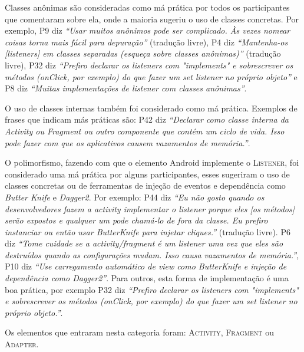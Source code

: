 Classes an\^onimas s\~ao consideradas como m\'a pr\'atica por todos os participantes que comentaram sobre ela, onde a maioria sugeriu o uso de classes concretas. Por exemplo, P9 diz \textit{``Usar muitos an\^onimos pode ser complicado. Às vezes nomear coisas torna mais f\'acil para depura\c{c}\~ao''} (tradu\c{c}\~ao livre), P4 diz \textit{``Mantenha-os [listeners] em classes separadas (esque\c{c}a sobre classes an\^onimas)''} (tradu\c{c}\~ao livre), P32 diz \textit{``Prefiro declarar os listeners com "implements" e sobrescrever os m\'etodos (onClick, por exemplo) do que fazer um set listener no pr\'oprio objeto''} e P8 diz \textit{``Muitas implementa\c{c}\~oes de listener com classes an\^onimas''}.

O uso de classes internas tamb\'em foi considerado como m\'a pr\'atica. Exemplos de frases que indicam m\'as pr\'aticas s\~ao: P42 diz \textit{``Declarar como classe interna da Activity ou Fragment ou outro componente que cont\'em um ciclo de vida. Isso pode fazer com que os aplicativos causem vazamentos de mem\'oria.''}.

O polimorfismo, fazendo com que o elemento Android implemente o \textsc{Listener}, foi considerado uma m\'a pr\'atica por alguns participantes, esses sugeriram o uso de classes concretas ou de ferramentas de inje\c{c}\~ao de eventos e depend\^encia como \textit{Butter Knife} \cite{ButterKnife} e \textit{Dagger2}. Por exemplo: P44 diz \textit{``Eu n\~ao gosto quando os desenvolvedores fazem a activity implementar o listener porque eles [os m\'etodos] ser\~ao expostos e qualquer um pode cham\'a-lo de fora da classe. Eu prefiro instanciar ou ent\~ao usar ButterKnife para injetar cliques.''} (tradu\c{c}\~ao livre). P6 diz \textit{``Tome cuidade se a activity/fragment \'e um listener uma vez que eles s\~ao destru\'idos quando as configura\c{c}\~oes mudam. Isso causa vazamentos de mem\'oria.''}, P10 diz \textit{``Use carregamento autom\'atico de view como ButterKnife e inje\c{c}\~ao de depend\^encia como Dagger2''}. Para outros, esta forma de implementa\c{c}\~ao \'e uma boa pr\'atica, por exemplo P32 diz \textit{``Prefiro declarar os listeners com "implements" e sobrescrever os m\'etodos (onClick, por exemplo) do que fazer um set listener no pr\'oprio objeto.''}.

Os elementos que entraram nesta categoria foram: \textsc{Activity}, \textsc{Fragment} ou \textsc{Adapter}.

